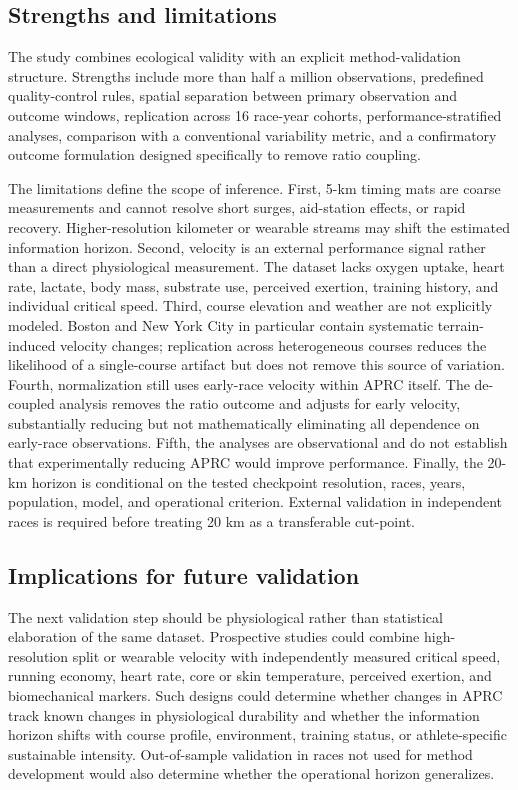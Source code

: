 \documentclass[pdflatex,sn-basic]{sn-jnl}
\begin{document}
\subsection{Strengths and limitations}
The study combines ecological validity with an explicit method-validation structure. Strengths include more than half a million observations, predefined quality-control rules, spatial separation between primary observation and outcome windows, replication across 16 race-year cohorts, performance-stratified analyses, comparison with a conventional variability metric, and a confirmatory outcome formulation designed specifically to remove ratio coupling.

The limitations define the scope of inference. First, 5-km timing mats are coarse measurements and cannot resolve short surges, aid-station effects, or rapid recovery. Higher-resolution kilometer or wearable streams may shift the estimated information horizon. Second, velocity is an external performance signal rather than a direct physiological measurement. The dataset lacks oxygen uptake, heart rate, lactate, body mass, substrate use, perceived exertion, training history, and individual critical speed. Third, course elevation and weather are not explicitly modeled. Boston and New York City in particular contain systematic terrain-induced velocity changes; replication across heterogeneous courses reduces the likelihood of a single-course artifact but does not remove this source of variation. Fourth, normalization still uses early-race velocity within APRC itself. The de-coupled analysis removes the ratio outcome and adjusts for early velocity, substantially reducing but not mathematically eliminating all dependence on early-race observations. Fifth, the analyses are observational and do not establish that experimentally reducing APRC would improve performance. Finally, the 20-km horizon is conditional on the tested checkpoint resolution, races, years, population, model, and operational criterion. External validation in independent races is required before treating 20 km as a transferable cut-point.

\subsection{Implications for future validation}
The next validation step should be physiological rather than statistical elaboration of the same dataset. Prospective studies could combine high-resolution split or wearable velocity with independently measured critical speed, running economy, heart rate, core or skin temperature, perceived exertion, and biomechanical markers. Such designs could determine whether changes in APRC track known changes in physiological durability and whether the information horizon shifts with course profile, environment, training status, or athlete-specific sustainable intensity. Out-of-sample validation in races not used for method development would also determine whether the operational horizon generalizes.
\end{document}
